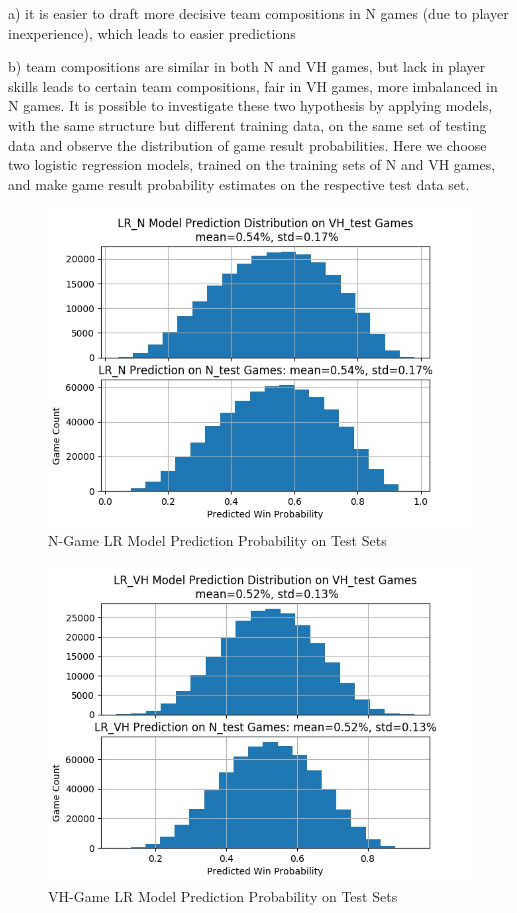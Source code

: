 \documentclass{article}
\begin{document}
\begin{appendix}
a) it is easier to draft more decisive team compositions in N games (due to player inexperience), which leads to easier predictions 

b) team compositions are similar in both N and VH games, but lack in player skills leads to certain team compositions, fair in VH games, more imbalanced in N games. It is possible to investigate these two hypothesis by applying models, with the same structure but different training data, on the same set of testing data and observe the distribution of game result probabilities. Here we choose two logistic regression models, trained on the training sets of N and VH games, and make game result probability estimates on the respective test data set.


\begin{figure}[htb]
 \centering 
 \includegraphics[scale=0.8]{Picture3.png}
 \caption{N-Game LR Model Prediction Probability on Test Sets}
 \label{image:pic3}
\end{figure}


\begin{figure}[htb]
 \centering 
 \includegraphics[scale=0.8]{Picture4.png}
 \caption{VH-Game LR Model Prediction Probability on Test Sets}
 \label{image:pic4}
\end{figure}



\end{appendix}
\end{document}
